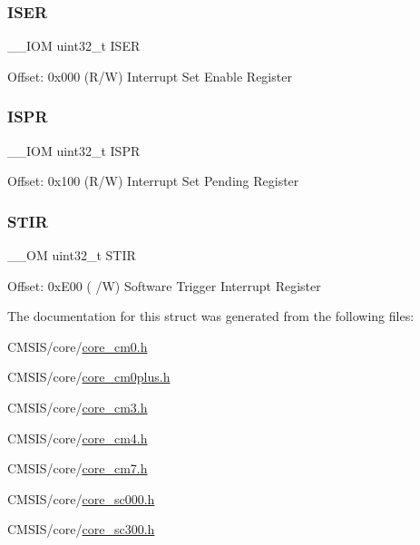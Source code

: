 \subsubsection{\texorpdfstring{I\+S\+ER}{ISER}}
{\footnotesize\ttfamily \+\_\+\+\_\+\+I\+OM uint32\+\_\+t I\+S\+ER}

Offset\+: 0x000 (R/W) Interrupt Set Enable Register \mbox{\label{struct_n_v_i_c___type_aecb96022a2971ea637c06798bd131e91}} 
\subsubsection{\texorpdfstring{I\+S\+PR}{ISPR}}
{\footnotesize\ttfamily \+\_\+\+\_\+\+I\+OM uint32\+\_\+t I\+S\+PR}

Offset\+: 0x100 (R/W) Interrupt Set Pending Register \mbox{\label{struct_n_v_i_c___type_ada9cbba14ab1cc3fddd585f870932db8}} 
\subsubsection{\texorpdfstring{S\+T\+IR}{STIR}}
{\footnotesize\ttfamily \+\_\+\+\_\+\+OM uint32\+\_\+t S\+T\+IR}

Offset\+: 0x\+E00 ( /W) Software Trigger Interrupt Register 

The documentation for this struct was generated from the following files\+:\begin{DoxyCompactItemize}
\item 
C\+M\+S\+I\+S/core/\hyperlink{core__cm0_8h}{core\+\_\+cm0.\+h}\item 
C\+M\+S\+I\+S/core/\hyperlink{core__cm0plus_8h}{core\+\_\+cm0plus.\+h}\item 
C\+M\+S\+I\+S/core/\hyperlink{core__cm3_8h}{core\+\_\+cm3.\+h}\item 
C\+M\+S\+I\+S/core/\hyperlink{core__cm4_8h}{core\+\_\+cm4.\+h}\item 
C\+M\+S\+I\+S/core/\hyperlink{core__cm7_8h}{core\+\_\+cm7.\+h}\item 
C\+M\+S\+I\+S/core/\hyperlink{core__sc000_8h}{core\+\_\+sc000.\+h}\item 
C\+M\+S\+I\+S/core/\hyperlink{core__sc300_8h}{core\+\_\+sc300.\+h}\end{DoxyCompactItemize}
